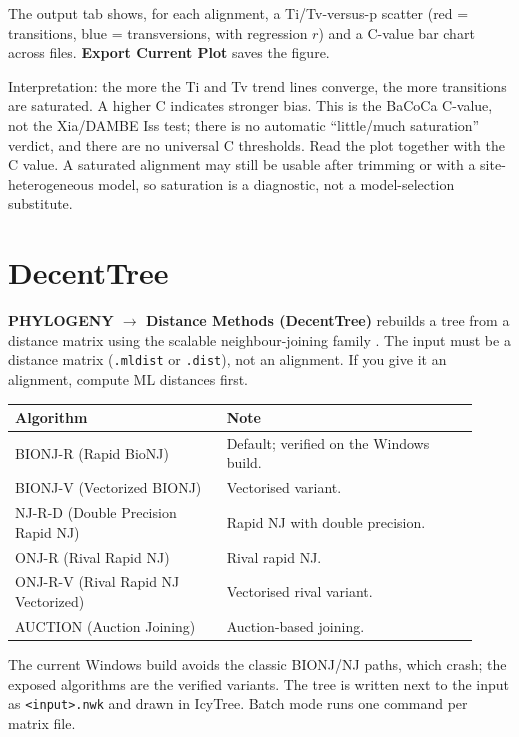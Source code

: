 \documentclass[10pt]{report}
\begin{document}
The output tab shows, for each alignment, a Ti/Tv-versus-p scatter (red =
transitions, blue = transversions, with regression $r$) and a C-value bar chart
across files. \textbf{Export Current Plot} saves the figure.

Interpretation: the more the Ti and Tv trend lines converge, the more
transitions are saturated. A higher C indicates stronger bias. This is the
BaCoCa C-value, not the Xia/DAMBE Iss test; there is no automatic
``little/much saturation'' verdict, and there are no universal C thresholds.
Read the plot together with the C value. A saturated alignment may still be
usable after trimming or with a site-heterogeneous model, so saturation is a
diagnostic, not a model-selection substitute.

\section{DecentTree}

\textbf{PHYLOGENY $\rightarrow$ Distance Methods (DecentTree)} rebuilds a tree
from a distance matrix using the scalable neighbour-joining family
\cite{decenttree}. The input
must be a distance matrix (\texttt{.mldist} or \texttt{.dist}), not an
alignment. If you give it an alignment, compute ML distances first.

\begin{longtable}{@{}>{\raggedright\arraybackslash}p{0.42\linewidth}
                      >{\raggedright\arraybackslash}p{0.50\linewidth}@{}}
\toprule
Algorithm & Note \\
\midrule
\endhead
BIONJ-R (Rapid BioNJ) & Default; verified on the Windows build. \\
BIONJ-V (Vectorized BIONJ) & Vectorised variant. \\
NJ-R-D (Double Precision Rapid NJ) & Rapid NJ with double precision. \\
ONJ-R (Rival Rapid NJ) & Rival rapid NJ. \\
ONJ-R-V (Rival Rapid NJ Vectorized) & Vectorised rival variant. \\
AUCTION (Auction Joining) & Auction-based joining. \\
\bottomrule
\end{longtable}

The current Windows build avoids the classic BIONJ/NJ paths, which crash; the
exposed algorithms are the verified variants. The tree is written next to the
input as \texttt{<input>.nwk} and drawn in IcyTree. Batch mode runs one command
per matrix file.
\end{document}
